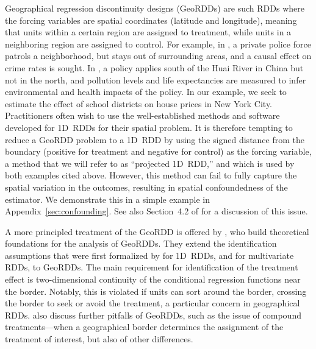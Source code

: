 \documentclass[letter]{article}
\renewcommand{\cite}[1]{\citet{#1}}
\begin{document}
    	Geographical regression discontinuity designs (GeoRDDs) are such RDDs where the forcing variables are spatial coordinates (latitude and longitude),
meaning that units within a certain region are assigned to treatment, while units in a neighboring region are assigned to control.
For example, in \cite{macdonald2015effect}, a private police force patrols a neighborhood, but stays out of surrounding areas, and a causal effect on crime rates is sought.
In \cite{chen2013evidence}, a policy applies south of the Huai River in China but not in the north, and pollution levels and life expectancies are measured to infer environmental and health impacts of the policy.
In our example, we seek to estimate the effect of school districts on house prices in New York City.
Practitioners often wish to use the well-established methods and software developed for 1D~RDDs for their spatial problem.
It is therefore tempting to reduce a GeoRDD problem to a 1D~RDD by using the signed distance from the boundary (positive for treatment and negative for control) as the forcing variable, a method that we will refer to as ``projected 1D~RDD,'' and which is used by both examples cited above.
However, this method can fail to fully capture the spatial variation in the outcomes, resulting in spatial confoundedness of the estimator.
We demonstrate this in a simple example in Appendix~\ref{sec:confounding}.
See also Section~4.2 of \cite{keele_titiunik_2015} for a discussion of this issue.
    


    	A more principled treatment of the GeoRDD is offered by \cite{keele_titiunik_2015}, who build theoretical foundations for the analysis of GeoRDDs.
They extend the identification assumptions that were first formalized by \cite{hahn2001identification} for 1D~RDDs, and \cite{imbens2011regression} for multivariate RDDs, to GeoRDDs.
The main requirement for identification of the treatment effect is two-dimensional continuity of the conditional regression functions near the border.
Notably, this is violated if units can sort around the border, crossing the border to seek or avoid the treatment, a particular concern in geographical RDDs.
\cite{keele_titiunik_2015} also discuss further pitfalls of GeoRDDs, such as the issue of compound treatments---when a geographical border determines the assignment of the treatment of interest, but also of other differences.
    
\end{document}
